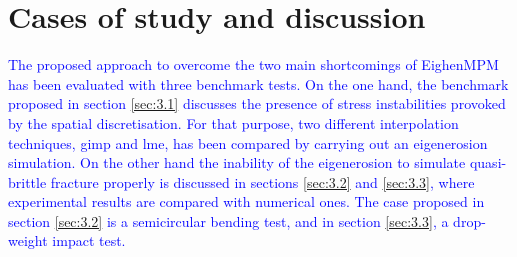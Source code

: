 \documentclass[preprint,12pt,a4paper]{elsarticle}
\begin{document}
\section{Cases of study and discussion}
\label{sec:3}

\textcolor{blue}{The proposed approach to overcome the two main shortcomings of
EighenMPM  has been evaluated with three benchmark tests. On the one hand, the benchmark proposed in section \ref{sec:3.1} discusses the presence of stress instabilities provoked by the spatial discretisation. For that purpose, two different interpolation techniques, \acrshort{gimp} and \acrshort{lme}, has been compared by carrying out an eigenerosion simulation. On the other hand the inability of the eigenerosion to simulate quasi-brittle fracture properly is discussed in sections \ref{sec:3.2} and \ref{sec:3.3}, where experimental results are compared with numerical ones. The case proposed in section \ref{sec:3.2} is a semicircular bending test, and in section \ref{sec:3.3}, a drop-weight impact test.}
\end{document}
